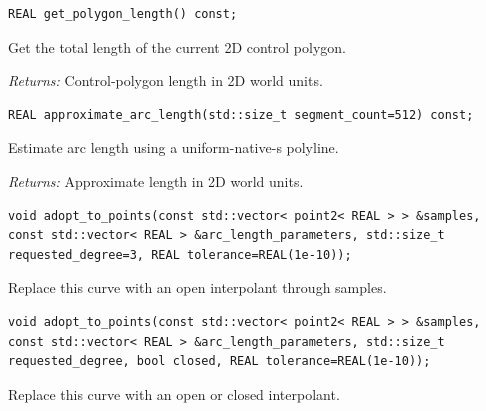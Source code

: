 \par\noindent\begin{minipage}{\linewidth}
\begin{lstlisting}[style=apireference]
REAL get_polygon_length() const;
\end{lstlisting}
{\footnotesize Get the total length of the current 2D control polygon.\par}
{\footnotesize\textit{Returns:} Control-polygon length in 2D world units.\par}
\end{minipage}\par\vspace{1pt}
\par\noindent\begin{minipage}{\linewidth}
\begin{lstlisting}[style=apireference]
REAL approximate_arc_length(std::size_t segment_count=512) const;
\end{lstlisting}
{\footnotesize Estimate arc length using a uniform-native-s polyline.\par}
{\footnotesize\textit{Returns:} Approximate length in 2D world units.\par}
\end{minipage}\par\vspace{1pt}
\par\noindent\begin{minipage}{\linewidth}
\begin{lstlisting}[style=apireference]
void adopt_to_points(const std::vector< point2< REAL > > &samples, const std::vector< REAL > &arc_length_parameters, std::size_t requested_degree=3, REAL tolerance=REAL(1e-10));
\end{lstlisting}
{\footnotesize Replace this curve with an open interpolant through samples.\par}
\end{minipage}\par\vspace{1pt}
\par\noindent\begin{minipage}{\linewidth}
\begin{lstlisting}[style=apireference]
void adopt_to_points(const std::vector< point2< REAL > > &samples, const std::vector< REAL > &arc_length_parameters, std::size_t requested_degree, bool closed, REAL tolerance=REAL(1e-10));
\end{lstlisting}
{\footnotesize Replace this curve with an open or closed interpolant.\par}
\end{minipage}\par\vspace{1pt}
